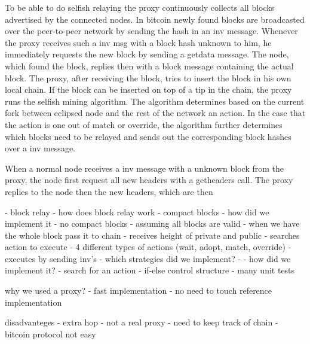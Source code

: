 To be able to do selfish relaying the proxy continuously collects all blocks advertised by the connected nodes.
In bitcoin newly found blocks are broadcasted over the peer-to-peer network by sending the hash in an inv message.
Whenever the proxy receives such a inv msg with a block hash unknown to him, he immediately requests the new block by sending a getdata message.
The node, which found the block, replies then with a block message containing the actual block.
The proxy, after receiving the block, tries to insert the block in his own local chain.
If the block can be inserted on top of a tip in the chain, the proxy runs the selfish mining algorithm.
The algorithm determines based on the current fork between eclipsed node and the rest of the network an action.
In the case that the action is one out of match or override, the algorithm further determines which blocks need to be relayed and sends out the corresponding block hashes over a inv message.

When a normal node receives a inv message with a unknown block from the proxy, the node first request all new headers with a getheaders call.
The proxy replies to the node then the new headers, which are then

 - block relay
   - how does block relay work
   - compact blocks
   - how did we implement it
     - no compact blocks
     - assuming all blocks are valid
     - when we have the whole block pass it to chain
 - receives height of private and public
 - searches action to execute
   - 4 different types of actions (wait, adopt, match, override)
 - executes by sending inv's
 - which strategies did we implement?
 - 
 - how did we implement it?
   - search for an action
   - if-else control structure
   - many unit tests
   
why we used a proxy?
 - fast implementation
 - no need to touch reference implementation

disadvanteges
 - extra hop
 - not a real proxy
   - need to keep track of chain
   - bitcoin protocol not easy
